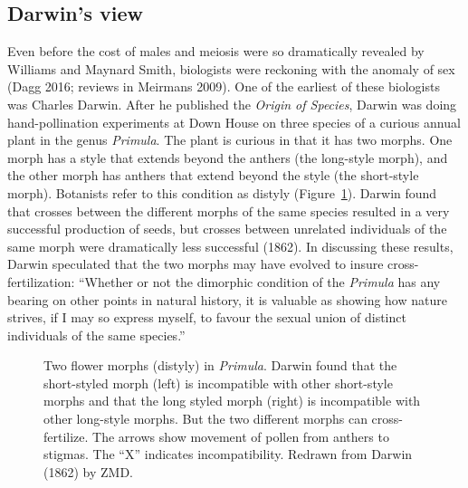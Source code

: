\documentclass[
  letterpaper,
]{book}
\begin{document}
\subsection{Darwin's view}\label{darwins-view}

Even before the cost of males and meiosis were so dramatically revealed
by Williams and Maynard Smith, biologists were reckoning with the
anomaly of sex (Dagg 2016; reviews in Meirmans 2009). One of the
earliest of these biologists was Charles Darwin. After he published the
\emph{Origin of Species}, Darwin was doing hand-pollination experiments
at Down House on three species of a curious annual plant in the genus
\emph{Primula}. The plant is curious in that it has two morphs. One
morph has a style that extends beyond the anthers (the long-style
morph), and the other morph has anthers that extend beyond the style
(the short-style morph). Botanists refer to this condition as distyly
(Figure~\ref{fig-1.3}). Darwin found that crosses between the different
morphs of the same species resulted in a very successful production of
seeds, but crosses between unrelated individuals of the same morph were
dramatically less successful (1862). In discussing these results, Darwin
speculated that the two morphs may have evolved to insure
cross-fertilization: ``Whether or not the dimorphic condition of the
\emph{Primula} has any bearing on other points in natural history, it is
valuable as showing how nature strives, if I may so express myself, to
favour the sexual union of distinct individuals of the same species.''

\begin{figure}


\caption[Two flower morphs (distyly) in
\emph{Primula}]{\label{fig-1.3}Two flower morphs (distyly) in
\emph{Primula}. Darwin found that the short-styled morph (left) is
incompatible with other short-style morphs and that the long styled
morph (right) is incompatible with other long-style morphs. But the two
different morphs can cross-fertilize. The arrows show movement of pollen
from anthers to stigmas. The ``X'' indicates incompatibility. Redrawn
from Darwin (1862) by ZMD.}

\end{figure}%
\end{document}
